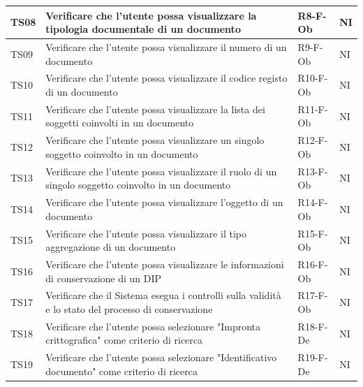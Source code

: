 \documentclass[a4paper,12pt]{article}
\begin{document}
\begin{longtable}{|M{1.2cm}|M{6.3cm}|M{2.5cm}|M{1.5cm}|}
                TS08 & Verificare che l'utente possa visualizzare la tipologia documentale di un documento & R8-F-Ob & NI \\
                \hline

                TS09 & Verificare che l'utente possa visualizzare il numero di un documento & R9-F-Ob & NI \\
                \hline

                TS10 & Verificare che l'utente possa visualizzare il codice registo di un documento & R10-F-Ob & NI \\
                \hline

                TS11 & Verificare che l'utente possa visualizzare la lista dei soggetti coinvolti in un documento & R11-F-Ob & NI \\
                \hline

                TS12 & Verificare che l'utente possa visualizzare un singolo soggetto coinvolto in un documento & R12-F-Ob & NI \\
                \hline

                TS13 & Verificare che l'utente possa visualizzare il ruolo di un singolo soggetto coinvolto in un documento & R13-F-Ob & NI \\
                \hline

                TS14 & Verificare che l'utente possa visualizzare l'oggetto di un documento & R14-F-Ob & NI \\
                \hline

                TS15 & Verificare che l'utente possa visualizzare il tipo aggregazione di un documento & R15-F-Ob & NI \\
                \hline

                TS16 & Verificare che l'utente possa visualizzare le informazioni di conservazione di un DIP & R16-F-Ob & NI \\
                \hline

                TS17 & Verificare che il Sistema esegua i controlli sulla validità e lo stato del processo di conservazione & R17-F-Ob & NI \\
                \hline

                TS18 & Verificare che l'utente possa selezionare "Impronta crittografica" come criterio di ricerca & R18-F-De & NI \\
                \hline

                TS19 & Verificare che l'utente possa selezionare "Identificativo documento" come criterio di ricerca & R19-F-De & NI \\
                \hline


\end{longtable}
\end{document}
